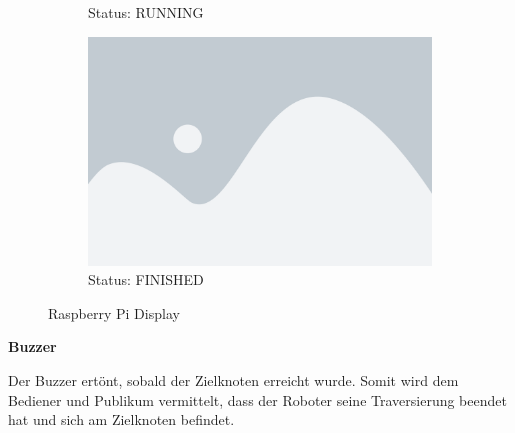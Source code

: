 \begin{figure}[H]
\begin{subfigure}[t]{0.30\textwidth}
    \caption*{Status: RUNNING}
    \end{subfigure}
    \hfill
    \begin{subfigure}[t]{0.30\textwidth}
        \includegraphics[width=\linewidth]{assets/placeholder.png}
    \caption*{Status: FINISHED}
    \end{subfigure}
    \caption{Raspberry Pi Display}
    \label{fig:raspiheader-display}
\end{figure}


\textbf{Buzzer}\label{peripherie-buzzer}

Der Buzzer ertönt, sobald der Zielknoten erreicht wurde. Somit wird dem Bediener und Publikum vermittelt, dass der Roboter seine Traversierung beendet hat und sich am Zielknoten befindet.
